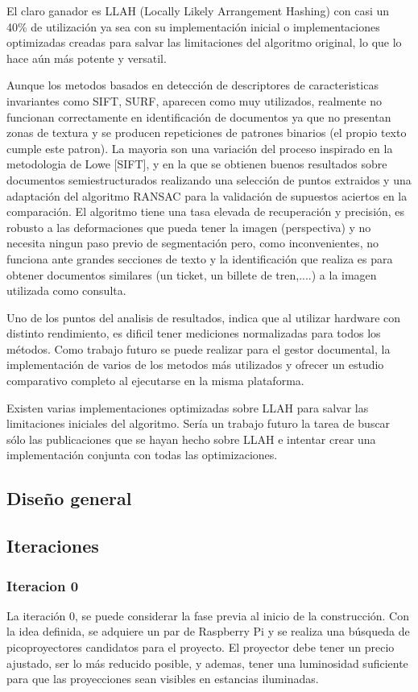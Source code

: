 El claro ganador es LLAH (Locally Likely Arrangement Hashing) con casi un 40\% de utilización ya sea con su implementación inicial o implementaciones optimizadas creadas para salvar las limitaciones del algoritmo original, lo que lo hace aún más potente y versatil.

Aunque los metodos basados en detección de descriptores de caracteristicas invariantes como SIFT, SURF, aparecen como muy utilizados, realmente no funcionan correctamente en identificación de documentos ya que no presentan zonas de textura y se producen repeticiones de patrones binarios (el propio texto cumple este patron). La mayoria son una variación del proceso inspirado en la metodologia de Lowe [SIFT], y en la que se obtienen buenos resultados sobre documentos semiestructurados realizando una selección de puntos extraidos y una adaptación del algoritmo RANSAC para la validación de supuestos aciertos en la comparación. El algoritmo tiene una tasa elevada de recuperación y precisión, es robusto a las deformaciones que pueda tener la imagen (perspectiva) y no necesita ningun paso previo de segmentación pero, como inconvenientes, no funciona ante grandes secciones de texto y la identificación que realiza es para obtener documentos similares (un ticket, un billete de tren,....) a la imagen utilizada como consulta.

Uno de los puntos del analisis de resultados, indica que al utilizar hardware con distinto rendimiento, es dificil tener mediciones normalizadas para todos los métodos. Como trabajo futuro se puede realizar para el gestor documental, la implementación de varios de los metodos más utilizados y ofrecer un estudio comparativo completo al ejecutarse en la misma plataforma.

Existen varias implementaciones optimizadas sobre LLAH para salvar las limitaciones iniciales del algoritmo. Sería un trabajo futuro la tarea de buscar sólo las publicaciones que se hayan hecho sobre LLAH e intentar crear una implementación conjunta  con todas las optimizaciones. 

\subsection{Diseño general}
\subsection{Iteraciones}
\subsubsection{Iteracion 0}
La iteración 0, se puede considerar la fase previa al inicio de la construcción. Con la idea definida, se adquiere un par de Raspberry Pi y se realiza una búsqueda de picoproyectores candidatos para el proyecto. 
El proyector debe tener un precio ajustado, ser lo más reducido posible, y ademas, tener una luminosidad suficiente para que las proyecciones sean visibles en estancias iluminadas.  

